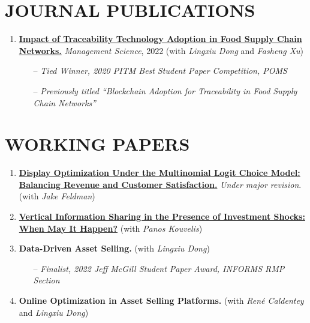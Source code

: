 \documentclass[margin]{res} %
\begin{document}
\begin{resume}
\section{JOURNAL PUBLICATIONS}
\begin{enumerate}[leftmargin=*]
    \item %
        \href{https://pubsonline.informs.org/doi/abs/10.1287/mnsc.2022.4440?casa_token=br5-nMm53OIAAAAA:nQxcEPswA7DUJZgJ1CZsL0DModEzd-a-1Y5zOh68ebSQo1LU177cocuRpaC3BXYQcoELLTilwzPY}{\textbf{Impact of Traceability Technology Adoption in Food Supply Chain Networks.}} {\it Management Science}, 2022 (with {\it Lingxiu Dong} and {\it Fasheng Xu})
        \begin{itemize}
            \item[--] {\it Tied Winner, 2020 PITM Best Student Paper Competition, POMS}
            \item[--] {\it Previously titled ``Blockchain Adoption for Traceability in Food Supply Chain Networks''}
        \end{itemize}
\end{enumerate}


    \section{WORKING PAPERS}
    \begin{enumerate}[resume,leftmargin=*]
        \item \href{https://papers.ssrn.com/sol3/papers.cfm?abstract_id=3909033}{\textbf{Display Optimization Under the Multinomial Logit Choice Model: Balancing Revenue and Customer Satisfaction.}} {\it Under major revision}. (with {\it Jake Feldman})
        \item \href{https://papers.ssrn.com/sol3/papers.cfm?abstract_id=3936170}{\textbf{Vertical Information Sharing in the Presence of Investment Shocks: When May It Happen?}} (with {\it Panos Kouvelis})
        \item \textbf{Data-Driven Asset Selling.} (with {\it Lingxiu Dong})
            \begin{itemize}
                \item[--] {\it Finalist, 2022 Jeff McGill Student Paper Award, INFORMS RMP Section}
            \end{itemize}
        \item \textbf{Online Optimization in Asset Selling Platforms.} (with {\it Ren\'{e} Caldentey} and {\it Lingxiu Dong})
    \end{enumerate}



\end{resume}
\end{document}
